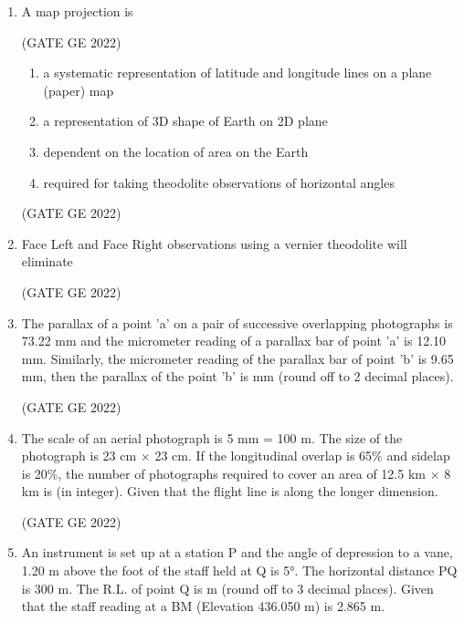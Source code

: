 \documentclass[journal,12pt,onecolumn]{IEEEtran}
\theoremstyle{remark}
\begin{document}
\begin{enumerate}
\item A map projection is

\hfill (GATE GE 2022)

\begin{enumerate}
    \item a systematic representation of latitude and longitude lines on a plane (paper) map
    \item a representation of 3D shape of Earth on 2D plane
    \item dependent on the location of area on the Earth
    \item required for taking theodolite observations of horizontal angles
\end{enumerate}

\hfill (GATE GE 2022)

\item Face Left and Face Right observations using a vernier theodolite will eliminate

\hfill (GATE GE 2022)

\begin{enumerate}
\end{enumerate}

\item The parallax of a point 'a' on a pair of successive overlapping photographs is 73.22 mm and the micrometer reading of a parallax bar of point 'a' is 12.10 mm. Similarly, the micrometer reading of the parallax bar of point 'b' is 9.65 mm, then the parallax of the point 'b' is \makebox[1cm]{\hrulefill} mm (round off to 2 decimal places).

\hfill (GATE GE 2022)

\item The scale of an aerial photograph is 5 mm = 100 m. The size of the photograph is 23 cm $\times$ 23 cm. If the longitudinal overlap is 65\% and sidelap is 20\%, the number of photographs required to cover an area of 12.5 km $\times$ 8 km is \makebox[1cm]{\hrulefill} (in integer). Given that the flight line is along the longer dimension.

\hfill (GATE GE 2022)

\item An instrument is set up at a station P and the angle of depression to a vane, 1.20 m above the foot of the staff held at Q is 5°. The horizontal distance PQ is 300 m. The R.L. of point Q is \makebox[1cm]{\hrulefill} m (round off to 3 decimal places). Given that the staff reading at a BM (Elevation 436.050 m) is 2.865 m.


\end{enumerate}
\end{document}
